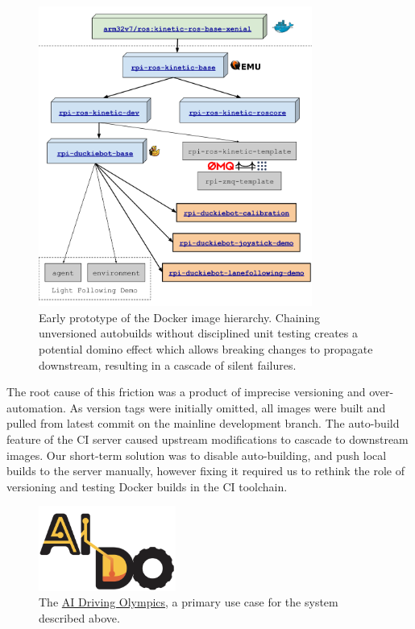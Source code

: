 \documentclass[12pt,initial,twoside,maitrise]{dms}
\numberwithin{equation}{section}
\numberwithin{table}{chapter}
\numberwithin{figure}{chapter}
\begin{document}
\begin{figure}
\includegraphics[width=0.80\textwidth]{../figures/image_provenance.png}
\caption{Early prototype of the Docker image hierarchy. Chaining unversioned autobuilds without disciplined unit testing creates a potential domino effect which allows breaking changes to propagate downstream, resulting in a cascade of silent failures.}
    \label{fig:early_prototype}
\end{figure}

The root cause of this friction was a product of imprecise versioning and over-automation. As version tags were initially omitted, all images were built and pulled from latest commit on the mainline development branch. The auto-build feature of the CI server caused upstream modifications to cascade to downstream images. Our short-term solution was to disable auto-building, and push local builds to the server manually, however fixing it required us to rethink the role of versioning and testing Docker builds in the CI toolchain.

\begin{figure}
    \includegraphics[width=0.40\textwidth]{../figures/aido_logo.png}
    \caption{The \href{https://www.duckietown.org/research/ai-driving-olympics}{AI Driving Olympics}, a primary use case for the system described above.}
    \label{fig:aido_logo}
\end{figure}
\end{document}
